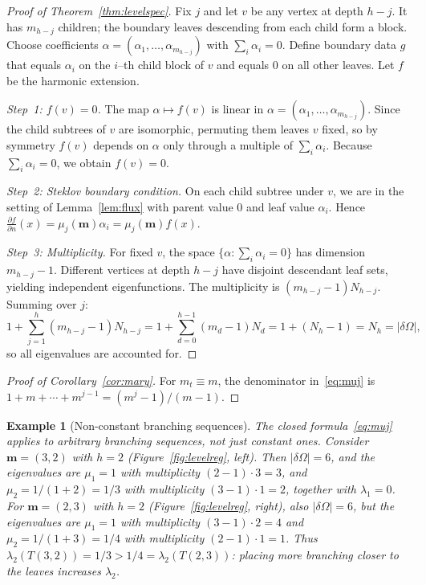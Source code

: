 \documentclass[11pt]{article}
\newtheorem{example}[theorem]{Example}
\theoremstyle{definition}
\theoremstyle{remark}
\newcommand{\dO}{\delta\Omega}
\begin{document}
\begin{proof}[Proof of Theorem~\ref{thm:levelspec}]
Fix $j$ and let $v$ be any vertex at depth $h-j$.
It has $m_{h-j}$ children; the boundary leaves descending from each child form a block.
Choose coefficients $\alpha=(\alpha_1,\dots,\alpha_{m_{h-j}})$ with $\sum_i\alpha_i=0$.
Define boundary data $g$ that equals $\alpha_i$ on the $i$--th child block of $v$ and equals $0$ on all other leaves.
Let $f$ be the harmonic extension.

\smallskip\noindent
\emph{Step~1: $f(v)=0$.}
The map $\alpha\mapsto f(v)$ is linear in $\alpha=(\alpha_1,\dots,\alpha_{m_{h-j}})$.
Since the child subtrees of $v$ are isomorphic, permuting them leaves $v$ fixed, so by symmetry $f(v)$ depends on $\alpha$ only through a multiple of $\sum_i\alpha_i$.
Because $\sum_i\alpha_i=0$, we obtain $f(v)=0$.

\smallskip\noindent
\emph{Step~2: Steklov boundary condition.}
On each child subtree under $v$, we are in the setting of Lemma~\ref{lem:flux} with parent value $0$ and leaf value $\alpha_i$.
Hence $\frac{\partial f}{\partial n}(x)=\mu_j(\mathbf{m})\alpha_i=\mu_j(\mathbf{m})f(x)$.

\smallskip\noindent
\emph{Step~3: Multiplicity.}
For fixed $v$, the space $\{\alpha:\sum_i\alpha_i=0\}$ has dimension $m_{h-j}-1$.
Different vertices at depth $h-j$ have disjoint descendant leaf sets, yielding independent eigenfunctions.
The multiplicity is $(m_{h-j}-1)N_{h-j}$.
Summing over $j$:
\[
1+\sum_{j=1}^h(m_{h-j}-1)N_{h-j}
=1+\sum_{d=0}^{h-1}(m_d-1)N_d
=1+(N_h-1)=N_h=|\dO|,
\]
so all eigenvalues are accounted for.
\end{proof}

\begin{proof}[Proof of Corollary~\ref{cor:mary}]
For $m_t\equiv m$, the denominator in~\eqref{eq:muj} is $1+m+\cdots+m^{j-1}=(m^j-1)/(m-1)$.
\end{proof}

\begin{example}[Non-constant branching sequences]\label{ex:nonconstant}
The closed formula~\eqref{eq:muj} applies to arbitrary branching sequences, not just constant ones.
Consider $\mathbf{m}=(3,2)$ with $h=2$ (Figure~\ref{fig:levelreg}, left).
Then $|\dO|=6$, and the eigenvalues are $\mu_1=1$ with multiplicity $(2-1)\cdot 3=3$, and $\mu_2=1/(1+2)=1/3$ with multiplicity $(3-1)\cdot 1=2$, together with $\lambda_1=0$.
For $\mathbf{m}=(2,3)$ with $h=2$ (Figure~\ref{fig:levelreg}, right), also $|\dO|=6$, but the eigenvalues are $\mu_1=1$ with multiplicity $(3-1)\cdot 2=4$ and $\mu_2=1/(1+3)=1/4$ with multiplicity $(2-1)\cdot 1=1$.
Thus $\lambda_2(T(3,2))=1/3>1/4=\lambda_2(T(2,3))$: placing more branching closer to the leaves increases $\lambda_2$.
\end{example}
\end{document}
